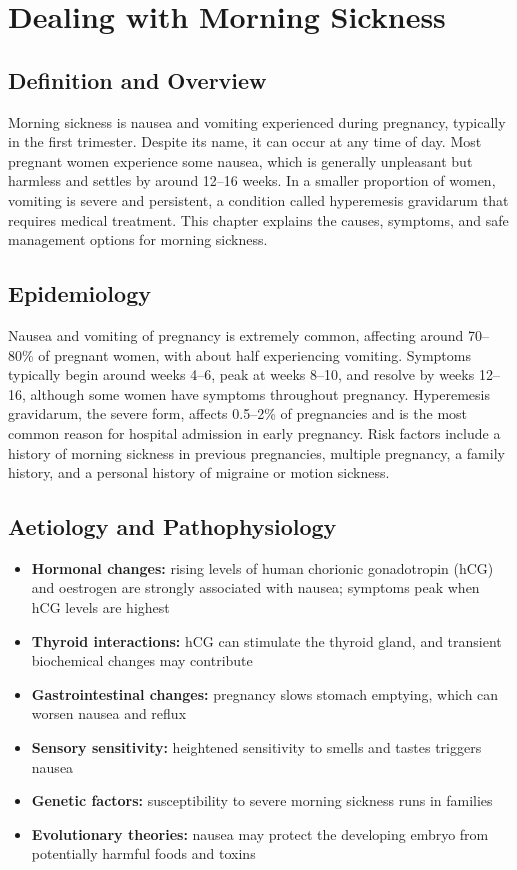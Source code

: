 \chapter{Dealing with Morning Sickness}

\section*{Definition and Overview}
Morning sickness is nausea and vomiting experienced during pregnancy, typically in the first trimester. Despite its name, it can occur at any time of day. Most pregnant women experience some nausea, which is generally unpleasant but harmless and settles by around 12--16 weeks. In a smaller proportion of women, vomiting is severe and persistent, a condition called hyperemesis gravidarum that requires medical treatment. This chapter explains the causes, symptoms, and safe management options for morning sickness.

\section*{Epidemiology}
Nausea and vomiting of pregnancy is extremely common, affecting around 70--80\% of pregnant women, with about half experiencing vomiting. Symptoms typically begin around weeks 4--6, peak at weeks 8--10, and resolve by weeks 12--16, although some women have symptoms throughout pregnancy. Hyperemesis gravidarum, the severe form, affects 0.5--2\% of pregnancies and is the most common reason for hospital admission in early pregnancy. Risk factors include a history of morning sickness in previous pregnancies, multiple pregnancy, a family history, and a personal history of migraine or motion sickness.

\section*{Aetiology and Pathophysiology}
\begin{itemize}
    \item \textbf{Hormonal changes:} rising levels of human chorionic gonadotropin (hCG) and oestrogen are strongly associated with nausea; symptoms peak when hCG levels are highest
    \item \textbf{Thyroid interactions:} hCG can stimulate the thyroid gland, and transient biochemical changes may contribute
    \item \textbf{Gastrointestinal changes:} pregnancy slows stomach emptying, which can worsen nausea and reflux
    \item \textbf{Sensory sensitivity:} heightened sensitivity to smells and tastes triggers nausea
    \item \textbf{Genetic factors:} susceptibility to severe morning sickness runs in families
    \item \textbf{Evolutionary theories:} nausea may protect the developing embryo from potentially harmful foods and toxins
\end{itemize}

